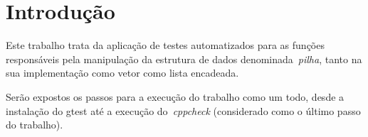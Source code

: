 \documentclass[conference]{Trabalho_1}
\begin{document}
\maketitle






%
\IEEEpeerreviewmaketitle



\section{Introdu\c{c}\~ao}
Este trabalho trata da aplica\c{c}\~ao de testes automatizados para as fun\c{c}\~oes respons\'aveis pela manipula\c{c}\~ao da estrutura de dados denominada~\textit{pilha}, tanto na sua implementa\c{c}\~ao como vetor como lista encadeada.

Ser\~ao expostos os passos para a execu\c{c}\~ao do trabalho como um todo, desde a instala\c{c}\~ao do gtest at\'e a execu\c{c}\~ao do~\textit{cppcheck} (considerado como o \'ultimo passo do trabalho). 
 


%
%
\end{document}
